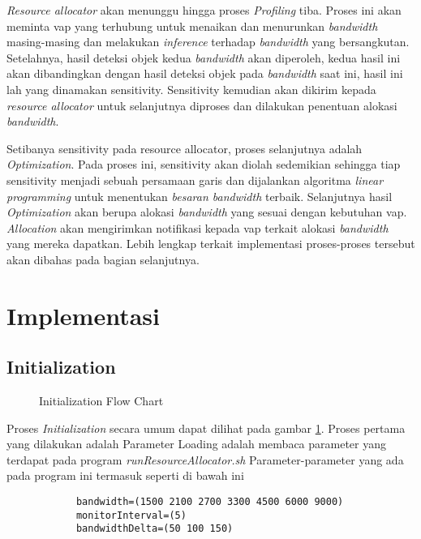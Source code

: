     \textit{Resource allocator} akan menunggu hingga proses \textit{Profiling} tiba. Proses ini akan meminta \gls{vap} yang terhubung untuk menaikan dan menurunkan \textit{bandwidth} masing-masing dan melakukan \textit{inference} terhadap \textit{bandwidth} yang bersangkutan.
    Setelahnya, hasil deteksi objek kedua \textit{bandwidth} akan diperoleh, kedua hasil ini akan dibandingkan dengan hasil deteksi objek pada \textit{bandwidth} saat ini, hasil ini lah yang dinamakan sensitivity. Sensitivity kemudian akan dikirim kepada \textit{resource allocator}
    untuk selanjutnya diproses dan dilakukan penentuan alokasi \textit{bandwidth}.

    Setibanya sensitivity pada resource allocator, proses selanjutnya adalah \textit{Optimization}. Pada proses ini, sensitivity akan diolah sedemikian sehingga tiap sensitivity menjadi sebuah persamaan garis dan dijalankan algoritma \textit{linear programming} untuk menentukan \textit{besaran bandwidth} terbaik.
    Selanjutnya hasil \textit{Optimization} akan berupa alokasi \textit{bandwidth} yang sesuai dengan kebutuhan \gls{vap}. \textit{Allocation} akan mengirimkan notifikasi kepada \gls{vap} terkait alokasi \textit{bandwidth} yang mereka dapatkan.
    Lebih lengkap terkait implementasi proses-proses tersebut akan dibahas pada bagian selanjutnya.

\section{Implementasi}
    \subsection{Initialization}

        \begin{figure}[tbh]
            \centering
            
            \caption{Initialization Flow Chart}\label{fig:initialization}
        \end{figure}    

        Proses \textit{Initialization} secara umum dapat dilihat pada gambar \ref{fig:initialization}. Proses pertama yang dilakukan adalah Parameter Loading adalah membaca parameter yang terdapat pada program \textit{runResourceAllocator.sh}
        Parameter-parameter yang ada pada program ini termasuk seperti di bawah ini

        \begin{verbatim}
            bandwidth=(1500 2100 2700 3300 4500 6000 9000)
            monitorInterval=(5)
            bandwidthDelta=(50 100 150)
        \end{verbatim}

